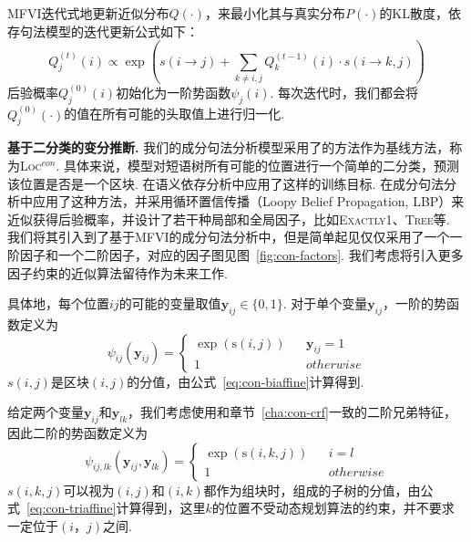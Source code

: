 MFVI迭代式地更新近似分布$Q(\cdot)$，来最小化其与真实分布$P(\cdot)$的KL散度，依存句法模型的迭代更新公式如下\cite{wang-tu-2020-second}：
\begin{equation}
    \label{eq:mfvi-dep}
    Q_{j}^{(t)}(i)\propto \exp\left(s(i\rightarrow j) +\sum_{k\neq i,j} Q_{k}^{(t-1)}(i)\cdot s(i\rightarrow {k,j}) \right)
\end{equation}
后验概率$Q_j^{(0)}(i)$初始化为一阶势函数$\psi_j(i)$.
每次迭代时，我们都会将$Q_j^{(0)}(\cdot)$的值在所有可能的头取值上进行归一化.

\noindent\textbf{基于二分类的变分推断.}
我们的成分句法分析模型采用了\cite{gaddy-etal-2018-whats}的方法作为基线方法，称为\textsc{Loc}$^{con}$.
具体来说，模型对短语树所有可能的位置进行一个简单的二分类，预测该位置是否是一个区块.
\cite{dozat-manning-2018-simpler,wang-etal-2019-second}在语义依存分析中应用了这样的训练目标.
\cite{gormley-eisner-2015-structured,naradowsky-etal-2012-grammarless}在成分句法分析中应用了这种方法，并采用循环置信传播（Loopy Belief Propagation, LBP）来近似获得后验概率，并设计了若干种局部和全局因子，比如\textsc{Exactly1}、\textsc{Tree}等.
我们将其引入到了基于MFVI的成分句法分析中，但是简单起见仅仅采用了一个一阶因子和一个二阶因子，对应的因子图见图~\ref{fig:con-factors}.
我们考虑将引入更多因子约束的近似算法留待作为未来工作.


具体地，每个位置$ij$的可能的变量取值$\boldsymbol{y}_{ij}\in \{0,1\}$. 对于单个变量$\boldsymbol{y}_{ij}$，一阶的势函数定义为
\begin{equation}
    \label{eq:1o-potential}
    \psi_{ij}(\boldsymbol{y}_{ij})=\left\{
    \begin{array}{rcl}
        \exp\left(\mathrm{s}(i,j)\right) &  & {\boldsymbol{y}_{ij}=1} \\
        1                                &  & {otherwise}
    \end{array}
    \right.
\end{equation}
$s(i,j)$是区块$(i,j)$的分值，由公式~\ref{eq:con-biaffine}计算得到.

给定两个变量$\boldsymbol{y}_{ij}$和$\boldsymbol{y}_{lk}$，我们考虑使用和章节~\ref{cha:con-crf}一致的二阶兄弟特征，因此二阶的势函数定义为
\begin{equation}
    \label{eq:2o-con-potential}
    \psi_{ij,lk}(\boldsymbol{y}_{ij},\boldsymbol{y}_{lk})=\left\{
    \begin{array}{rcl}
        \exp\left(\mathrm{s}(i,k,j)\right) &  & {i=l}       \\
        1                                  &  & {otherwise}
    \end{array}
    \right.
\end{equation}
$s(i,k,j)$可以视为$(i,j)$和$(i,k)$都作为组块时，组成的子树的分值，由公式~\ref{eq:con-triaffine}计算得到，这里$k$的位置不受动态规划算法的约束，并不要求一定位于$(i，j)$之间.

